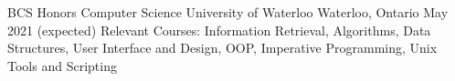 


\begin{cventries}


\cventry
{BCS Honors Computer Science}%
{University of Waterloo}
{Waterloo, Ontario} %
    {May 2021 (expected)} %
{ %
    Relevant Courses: Information Retrieval, Algorithms, Data Structures, User Interface and Design,
     OOP, Imperative Programming, Unix Tools and Scripting \vspace{0.05mm}
}


\end{cventries}
